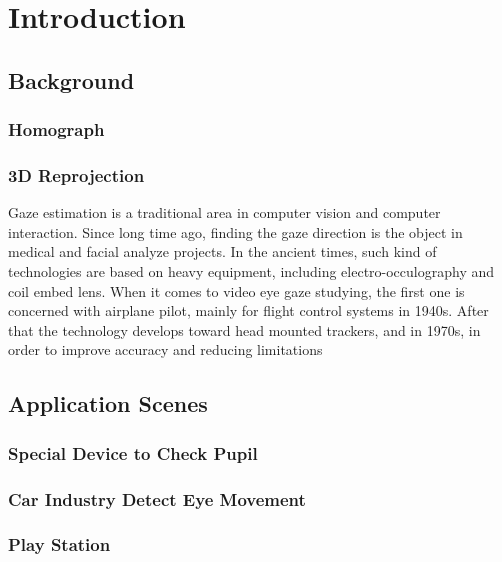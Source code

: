 \documentclass[senior]{IPSstyle}
\begin{document}
 \makepreliminarypages
 \singlespace
 \frontmatter
 \tableofcontents
 \listoffigures
 \listoftables
 \mainmatter
 \clearemptydoublepage
 \setlength{\baselineskip}{23.0pt}

\chapter{Introduction} \label{introduction}



\section{Background}
\subsection{Homograph}
\subsection{3D Reprojection}

% 
Gaze estimation is a traditional area in computer vision and computer interaction. Since long time ago, finding the gaze direction is the object in medical and facial analyze projects. In the ancient times, such kind of technologies are based on heavy equipment, including electro-occulography and coil embed lens. When it comes to video eye gaze studying\cite{mohamed2007history}, the first one is concerned with airplane pilot, mainly for flight control systems in 1940s. After that the technology develops toward head mounted trackers, and in 1970s, in order to improve accuracy and reducing limitations 


\section{Application Scenes}
\subsection{Special Device to Check Pupil}
\subsection{Car Industry Detect Eye Movement}
\subsection{Play Station}
\end{document}
